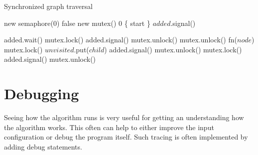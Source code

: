 \begin{algorithm}
\caption{Synchronized graph traversal}
\label{synctravel}
\begin{algorithmic}[1]

             {new semaphore(0)}
         {false}
             {new mutex()}
           {0}
         {\{ start \}}
        \State $added$.signal()
        
        \Spawn
                \State added.wait() 
                \State mutex.lock() 
                    \State added.signal() 
                    \State mutex.unlock()
                \EndIf
                \State mutex.unlock() 
                \State fn($node$) 
                    \State mutex.lock() 
                        \State $unvisited$.put($child$)
                        \State added.signal()
                    \EndIf
                    \State mutex.unlock()
                \EndFor
                \State mutex.lock() 
                    \State added.signal() 
                \EndIf
                \State mutex.unlock()
            \EndWhile
        \EndSpawn

    \EndFunction
\end{algorithmic}
\end{algorithm}

\section{Debugging}

Seeing how the algorithm runs is very useful for getting an understanding how the algorithm works. This often can help to either improve the input configuration or debug the program itself. Such tracing is often implemented by adding debug statements.

